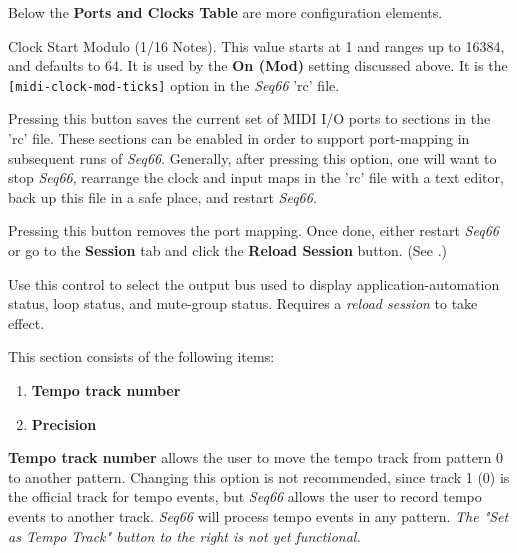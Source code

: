    Below the \textbf{Ports and Clocks Table} are more configuration elements.

   \setcounter{ItemCounter}{0}      %

   Clock Start Modulo (1/16 Notes).
   This value starts at 1 and ranges up to 16384, and defaults to 64.
   It is used by the \textbf{On (Mod)} setting discussed above.
   It is the \texttt{[midi-clock-mod-ticks]} option in the \textsl{Seq66}
   'rc' file.

   Pressing this button saves the current set of MIDI I/O ports to sections in
   the 'rc' file.  These sections can be enabled in order to support
   port-mapping in subsequent runs of \textsl{Seq66}.
   Generally, after pressing this option, one will want to stop
   \textsl{Seq66}, rearrange the clock and input maps in the
   'rc' file with a text editor, back up this file in a safe place,
   and restart \textsl{Seq66}.

   Pressing this button removes the port mapping.
   Once done, either restart \textsl{Seq66} or go to the \textbf{Session}
   tab and click the \textbf{Reload Session} button.
   (See .)

   Use this control to select the output bus used to display
   application-automation status, loop status, and mute-group status.
   Requires a \textsl{reload session} to take effect.

   This section consists of the following items:

   \begin{enumerate}
      \item \textbf{Tempo track number}
      \item \textbf{Precision}
   \end{enumerate}

   \textbf{Tempo track number}
   allows the user to move the tempo track from pattern 0 to
   another pattern.  Changing this option is not recommended, since track 1 (0)
   is the official track for tempo events, but \textsl{Seq66} allows the
   user to record tempo events to another track.  \textsl{Seq66} will
   process tempo events in any pattern.
   \textsl{The "Set as Tempo Track" button to the right is not yet functional.}

